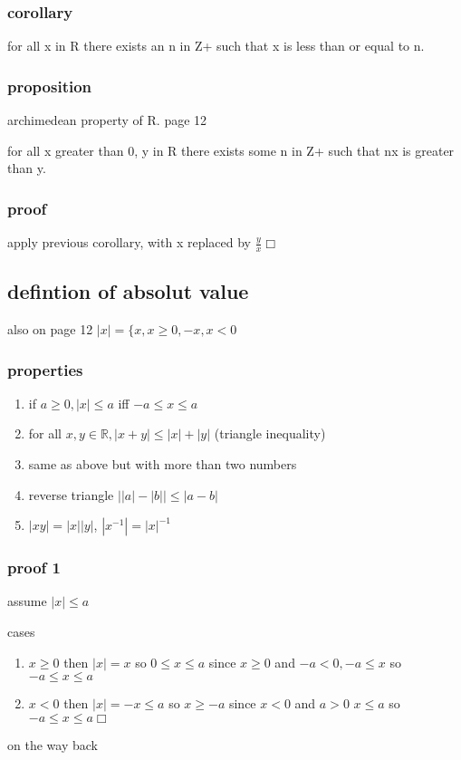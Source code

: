 \documentclass[letterpaper]{article}
\newcommand{\abs}[1]{\left\lvert #1 \right\rvert}
\begin{document}
\subsubsection*{corollary}
for all x in R there exists an n in Z+ such  that x is less than or equal to n.
\subsubsection*{proposition}
archimedean property of R. page 12

for all x greater than 0, y in R there exists some n in Z+ such that nx is greater than y.
\subsubsection*{proof}
apply previous corollary, with x replaced by $\frac{y}{x}\Box$
\subsection*{defintion of absolut value}
also on page 12
$\abs{x}=\{x,x\ge0, -x,x<0$
\subsubsection*{properties}
\begin{enumerate}
\item
if $a\ge0, \abs{x}\le a$ iff $-a\le x\le a$
\item
for all $x,y\in \mathbb{R}, \abs{x+y}\le\abs{x}+\abs{y}$ (triangle inequality)
\item
same as above but with more than two numbers
\item
reverse triangle $\abs{\abs{a}-\abs{b}}\le \abs{a-b}$
\item
$\abs{xy}=\abs{x}\abs{y}$, $\abs{x^{-1}}=\abs{x}^{-1}$
\end{enumerate}
\subsubsection*{proof 1}
assume $\left\lvert x\right\rvert\le a$

cases
\begin{enumerate}
\item
$x\ge 0$ then $\abs{x}=x$ so $0\le x\le a$ since $x\ge 0$ and $-a<0, -a\le x$ so $-a\le x\le a$
\item
$x<0$ then $\left\lvert x\right\rvert=-x\le a$ so $x\ge -a$ since $x<0$ and $a>0$ $x\le a$ so $-a\le x\le a$$\Box$
\end{enumerate}
on the way back
\end{document}
